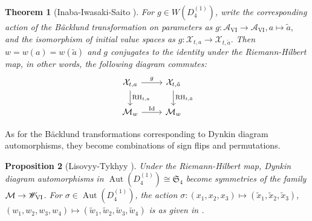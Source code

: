 \documentclass[a4paper,reqno]{amsart}
\numberwithin{equation}{section}
\DeclareMathOperator{\Aut}{Aut}
\newtheorem{theorem}{Theorem}[section]
\newtheorem{proposition}[theorem]{Proposition}
\numberwithin{equation}{section}
\begin{document}
\begin{theorem}[Inaba-Iwasaki-Saito \cite{inabaiwasakisaito}]\label{thm:PVIRHsymmetries}
For $g\in W(D_4^{(1)})$, write the corresponding action of the B\"acklund transformation on parameters as $g : \mathscr{A}_{\mathrm{VI}} \to \mathscr{A}_{\mathrm{VI}},  a \mapsto \tilde{a},$
and the isomorphism of initial value spaces as 
$g : \mathcal{X}_{t,a}  \rightarrow \mathcal{X}_{t,\tilde{a}}.$
Then $w=w(a)=w(\tilde{a})$ and $g$ conjugates to the identity under the Riemann-Hilbert map, in other words, the following diagram commutes:
\begin{equation*}
    \begin{tikzcd}
        \mathcal{X}_{t,a} \arrow[d,"\operatorname{RH}_{t,a}"] \arrow[r,"g"] & \mathcal{X}_{t,\tilde{a}} \arrow[d,"\operatorname{RH}_{t,\tilde{a}}"] \\
        \mathcal{M}_{w} \arrow[r,"\operatorname{Id}"] & \mathcal{M}_{w}
    \end{tikzcd}
\end{equation*}
\end{theorem}
As for the B\"acklund transformations corresponding to Dynkin diagram automorphisms, they become combinations of sign flips and permutations.


\begin{proposition}[Lisovyy-Tykhyy \cite{lisovyyalgebraic}] \label{prop:PVI:dynkinautosunderRH}
    Under the Riemann-Hilbert map, Dynkin diagram automorphisms in $\Aut(D_4^{(1)})\cong \mathfrak{S}_4$ become symmetries of the family $\mathcal{M}\rightarrow \mathscr{W}_{\rm VI}$. 
    For $\sigma\in\Aut(D_4^{(1)})$, the action $\sigma: (x_1,x_2,x_3)\mapsto(\tilde{x}_1,\tilde{x}_2,\tilde{x}_3)$, $(w_1,w_2,w_3,w_4)\mapsto(\tilde{w}_1,\tilde{w}_2,\tilde{w}_3,\tilde{w}_4)$ is as given in .
\end{proposition}

\begingroup

\setlength{\tabcolsep}{15pt} %
\renewcommand{\arraystretch}{1.5} %
\end{document}
